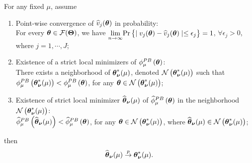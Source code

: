 
\begin{theorem}
For any fixed $\mu$, assume 
\begin{enumerate}
\item Point-wise convergence of $\widehat{v}_j(\boldsymbol{\theta})$ in probability:\\ For every $ \boldsymbol{\theta} \in \mathcal{F}(\boldsymbol{\Theta})$, we have $ \underset{n \to \infty}{\lim} \text{Pr} \left\{ \mid v_j(\boldsymbol{\theta}) - \widehat{v}_j(\boldsymbol{\theta}) \mid \le \epsilon_j \right\}  = 1$, $\forall \epsilon_j > 0$, where $j = 1, \cdots, J$;
\item Existence of a strict local minimizers of $\phi^{PB}_{\mu}\left(\boldsymbol{\theta}\right)$:\\
 There exists a neighborhood of $\boldsymbol{\theta}^{*}_{\boldsymbol{\nu}}(\mu)$, denoted $\mathcal{N}\left(\boldsymbol{\theta}^{*}_{\boldsymbol{\nu}}(\mu)\right)$ such that $\phi^{PB}_{\mu}\left(\boldsymbol{\theta}^{*}_{\boldsymbol{\nu}}(\mu)\right) < \phi^{PB}_{\mu}\left(\boldsymbol{\theta}\right)$, for any $\boldsymbol{\theta} \in \mathcal{N}\left(\boldsymbol{\theta}^{*}_{\boldsymbol{\nu}}(\mu)\right)$;
\item Existence of strict local minimizer $\widehat{\boldsymbol{\theta}}_{\boldsymbol{\nu}}(\mu)$ of $\widehat{\phi}^{PB}_{\mu}\left(\boldsymbol{\theta}\right)$ in the neighborhood $\mathcal{N}\left(\boldsymbol{\theta}^{*}_{\boldsymbol{\nu}}(\mu)\right)$:\\  
$ \widehat{\phi}^{PB}_{\mu}\left(\widehat{\boldsymbol{\theta}}_{\boldsymbol{\nu}}(\mu)\right) < \widehat{\phi}^{PB}_{\mu}\left(\boldsymbol{\theta}\right)$, for any $\boldsymbol{\theta} \in \mathcal{N}\left(\boldsymbol{\theta}^{*}_{\boldsymbol{\nu}}(\mu)\right)$, where $\widehat{\boldsymbol{\theta}}_{\boldsymbol{\nu}}(\mu) \in \mathcal{N}\left(\boldsymbol{\theta}^{*}_{\boldsymbol{\nu}}(\mu)\right)$;
\end{enumerate} then 
$$\widehat{\boldsymbol{\theta}}_{\boldsymbol{\nu}}(\mu) \overset{p}{\to} \boldsymbol{\theta}^{*}_{\boldsymbol{\nu}}(\mu).$$

\end{theorem}
